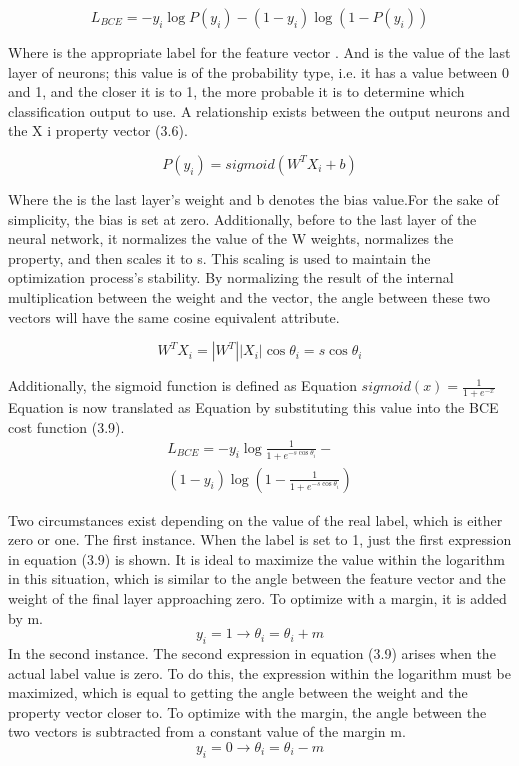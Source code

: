 \documentclass[journal]{IEEEtran}
\begin{document}
\begin{equation}\label{eq:bce}
	L_{BCE} = -y_i \log{P(y_i)} - (1-y_i)\log{( 1-P(y_i) )}
\end{equation}

Where  is the appropriate label for the feature vector . And  is the value of the last layer of neurons; this value is of the probability type, i.e. it has a value between 0 and 1, and the closer it is to 1, the more probable it is to determine which classification output to use. A relationship exists between the output neurons and the X i property vector (3.6).

\begin{equation}\label{eq:pyi}
	P(y_i) = sigmoid(W^TX_i+b)
\end{equation}

Where the   is the last layer's weight and b denotes the bias value.For the sake of simplicity, the bias is set at zero. Additionally, before to the last layer of the neural network, it normalizes the value of the W weights, normalizes the  property, and then scales it to s. This scaling is used to maintain the optimization process's stability. By normalizing the result of the internal multiplication between the weight and the vector, the angle between these two vectors will have the same cosine equivalent attribute.

 \begin{equation}\label{eq:wti}
	W^TX_i = |W^T||X_i| \cos{\theta_i}=s\cos{\theta_i}
\end{equation}

Additionally, the sigmoid function is defined as Equation $sigmoid(x) = \frac{1}{1+e^{-x}}$
Equation is now translated as Equation by substituting this value into the BCE cost function (3.9).
\begin{multline}\label{eq:bcenorm}
	L_{BCE} = -y_i \log{\frac{1}{1+e^{-s\cos{\theta_i}}}} - \\ (1-y_i)\log{(1-\frac{1}{1+e^{-s\cos{\theta_i}}} )}
\end{multline}

Two circumstances exist depending on the value of the real  label, which is either zero or one.
The first instance. When the label is set to 1, just the first expression in equation (3.9) is shown. It is ideal to maximize the value within the logarithm in this situation, which is similar to the angle between the feature vector and the weight of the final layer approaching zero. To optimize with a margin, it is added by m.
\begin{equation}\label{eq:st1}
	y_i=1 \to \theta_i= \theta_i + m
\end{equation}
In the second instance. The second expression in equation (3.9) arises when the actual label value is zero.
To do this, the expression within the logarithm must be maximized, which is equal to getting the angle between the weight and the property vector closer to. To optimize with the margin, the angle between the two vectors is subtracted from a constant value of the margin m.
\begin{equation}\label{eq:st2}
	y_i=0 \to \theta_i= \theta_i - m
\end{equation}
\end{document}

